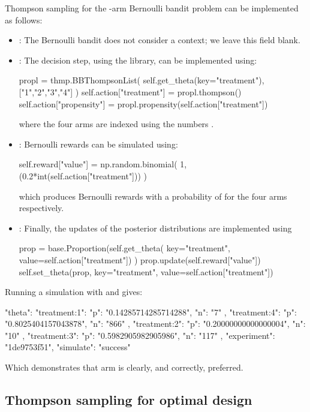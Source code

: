 \documentclass[nojss]{jss}
\begin{document}
Thompson sampling for the -arm Bernoulli bandit problem can be implemented as follows:
\begin{itemize}
\item {}: The Bernoulli bandit does not consider a context; we leave this field blank.
\item {}: The decision step, using the  library, can be implemented using:
\begin{Code}
propl = thmp.BBThompsonList(
     self.get_theta(key="treatment"), ["1","2","3","4"]
     )
self.action["treatment"] = propl.thompson()
self.action["propensity"] = propl.propensity(self.action["treatment"])
\end{Code}
where the four arms are indexed using the numbers .

\item {}: Bernoulli rewards can be simulated using:
\begin{Code}
self.reward["value"] = np.random.binomial(
     1,(0.2*int(self.action["treatment"]))
     )
\end{Code}
which produces Bernoulli rewards with a probability of  for the four arms respectively.

\item {}: Finally, the updates of the posterior distributions are implemented using
\begin{Code}
prop = base.Proportion(self.get_theta(
     key="treatment", value=self.action["treatment"])
     )
prop.update(self.reward["value"])
self.set_theta(prop, key="treatment", value=self.action["treatment"])
\end{Code}

\end{itemize}

Running a simulation with  and  gives:
\begin{Code}
{
    "theta": {
        "treatment:1": {
            "p": "0.14285714285714288",
            "n": "7"
        },
        "treatment:4": {
            "p": "0.8025404157043878",
            "n": "866"
        },
        "treatment:2": {
            "p": "0.20000000000000004",
            "n": "10"
        },
        "treatment:3": {
            "p": "0.5982905982905986",
            "n": "117"
        }
    },
    "experiment": "1de9753f51",
    "simulate": "success"
}
\end{Code}
Which demonstrates that arm  is clearly, and correctly, preferred.

\subsection{Thompson sampling for optimal design}
\end{document}
